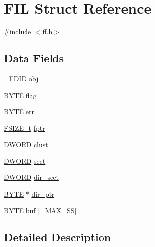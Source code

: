 \hypertarget{structFIL}{}\section{F\+IL Struct Reference}
\label{structFIL}


{\ttfamily \#include $<$ff.\+h$>$}

\subsection*{Data Fields}
\begin{DoxyCompactItemize}
\item 
\hyperlink{struct__FDID}{\+\_\+\+F\+D\+ID} \hyperlink{structFIL_ae7242545ea88ea2602484122ebe65fa3}{obj}
\item 
\hyperlink{lz4_8c_a4ae1dab0fb4b072a66584546209e7d58}{B\+Y\+TE} \hyperlink{structFIL_ac409508881f5a16f2998ae675072b376}{flag}
\item 
\hyperlink{lz4_8c_a4ae1dab0fb4b072a66584546209e7d58}{B\+Y\+TE} \hyperlink{structFIL_aea440945db26de9c4a88065c0c887fda}{err}
\item 
\hyperlink{ff_8h_a3fc0992ad7436250b6b1a0592214b7f2}{F\+S\+I\+Z\+E\+\_\+t} \hyperlink{structFIL_a088b03ab2e02f82e10e17bdd938190a6}{fptr}
\item 
\hyperlink{integer_8h_ad342ac907eb044443153a22f964bf0af}{D\+W\+O\+RD} \hyperlink{structFIL_aa41312aba551b9a6d1c9d3c8c7d2734b}{clust}
\item 
\hyperlink{integer_8h_ad342ac907eb044443153a22f964bf0af}{D\+W\+O\+RD} \hyperlink{structFIL_affec18b48fe716fdae6a60123fc61145}{sect}
\item 
\hyperlink{integer_8h_ad342ac907eb044443153a22f964bf0af}{D\+W\+O\+RD} \hyperlink{structFIL_ab203794f939ad4480e81dfa488770783}{dir\+\_\+sect}
\item 
\hyperlink{lz4_8c_a4ae1dab0fb4b072a66584546209e7d58}{B\+Y\+TE} $\ast$ \hyperlink{structFIL_a5af9e9fb312b629220eaf684dd28c4a9}{dir\+\_\+ptr}
\item 
\hyperlink{lz4_8c_a4ae1dab0fb4b072a66584546209e7d58}{B\+Y\+TE} \hyperlink{structFIL_a7a95fb86588663e48309b5cded7e207b}{buf} \mbox{[}\hyperlink{ffconf_8h_ac271b697378912f17132cb9c7d0de024}{\+\_\+\+M\+A\+X\+\_\+\+SS}\mbox{]}
\end{DoxyCompactItemize}


\subsection{Detailed Description}


